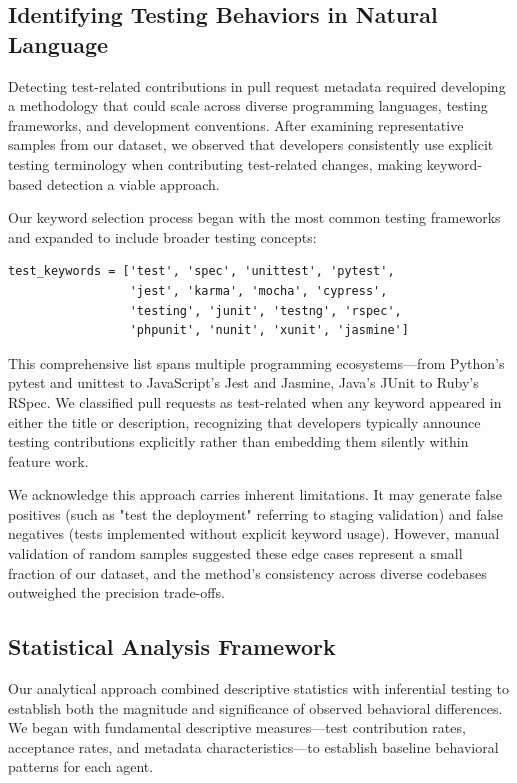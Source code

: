 \documentclass[conference]{IEEEtran}
\begin{document}
\subsection{Identifying Testing Behaviors in Natural Language}

Detecting test-related contributions in pull request metadata required developing a methodology that could scale across diverse programming languages, testing frameworks, and development conventions. After examining representative samples from our dataset, we observed that developers consistently use explicit testing terminology when contributing test-related changes, making keyword-based detection a viable approach.

Our keyword selection process began with the most common testing frameworks and expanded to include broader testing concepts:

\begin{verbatim}
test_keywords = ['test', 'spec', 'unittest', 'pytest', 
                 'jest', 'karma', 'mocha', 'cypress', 
                 'testing', 'junit', 'testng', 'rspec',
                 'phpunit', 'nunit', 'xunit', 'jasmine']
\end{verbatim}

This comprehensive list spans multiple programming ecosystems—from Python's pytest and unittest to JavaScript's Jest and Jasmine, Java's JUnit to Ruby's RSpec. We classified pull requests as test-related when any keyword appeared in either the title or description, recognizing that developers typically announce testing contributions explicitly rather than embedding them silently within feature work.

We acknowledge this approach carries inherent limitations. It may generate false positives (such as "test the deployment" referring to staging validation) and false negatives (tests implemented without explicit keyword usage). However, manual validation of random samples suggested these edge cases represent a small fraction of our dataset, and the method's consistency across diverse codebases outweighed the precision trade-offs.

\subsection{Statistical Analysis Framework}

Our analytical approach combined descriptive statistics with inferential testing to establish both the magnitude and significance of observed behavioral differences. We began with fundamental descriptive measures—test contribution rates, acceptance rates, and metadata characteristics—to establish baseline behavioral patterns for each agent.
\end{document}

